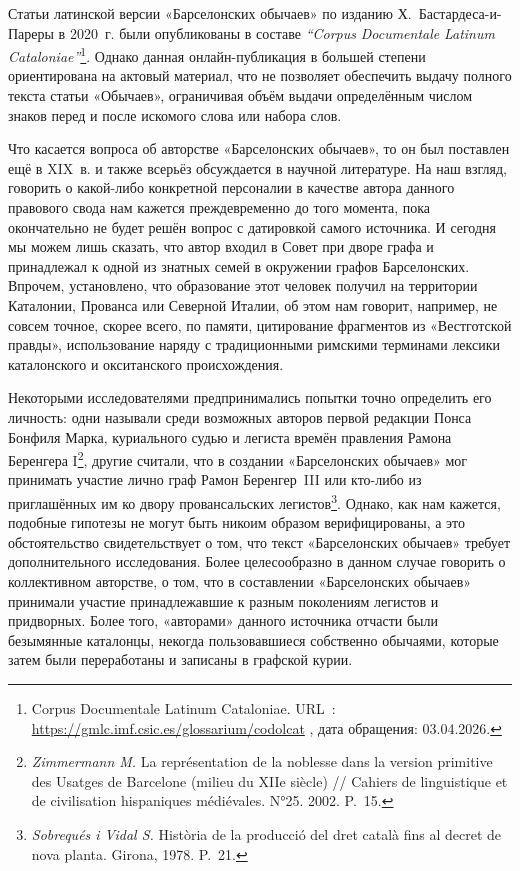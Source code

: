Статьи латинской версии «Барселонских обычаев» по изданию Х.~Бастардеса-и-Пареры в 2020~г. были опубликованы в составе \emph{“Corpus }\emph{Documentale}\emph{ }\emph{Latinum}\emph{ }\emph{Cataloniae}\emph{”}\footnote{Corpus Documentale Latinum Cataloniae. URL~: \url{https://gmlc.imf.csic.es/glossarium/codolcat} , дата обращения: 03.04.2026.}. Однако данная онлайн-публикация в большей степени ориентирована на актовый материал, что не позволяет обеспечить выдачу полного текста статьи «Обычаев», ограничивая объём выдачи определённым числом знаков перед и после искомого слова или набора слов.

Что касается вопроса об авторстве «Барселонских обычаев», то он был поставлен ещё в XIX~в. и также всерьёз обсуждается в научной литературе. На наш взгляд, говорить о какой-либо конкретной персоналии в качестве автора данного правового свода нам кажется преждевременно до того момента, пока окончательно не будет решён вопрос с датировкой самого источника. И сегодня мы можем лишь сказать, что автор входил в Совет при дворе графа и принадлежал к одной из знатных семей в окружении графов Барселонских. Впрочем, установлено, что образование этот человек получил на территории Каталонии, Прованса или Северной Италии, об этом нам говорит, например, не совсем точное, скорее всего, по памяти, цитирование фрагментов из «Вестготской правды», использование наряду с традиционными римскими терминами лексики каталонского и окситанского происхождения.

Некоторыми исследователями предпринимались попытки точно определить его личность: одни называли среди возможных авторов первой редакции Понса Бонфиля Марка, куриального судью и легиста времён правления Рамона Беренгера I\footnote{\emph{Zimmermann M. }La représentation de la noblesse dans la version primitive des Usatges de Barcelone (milieu du XIIe siècle) // Cahiers de linguistique et de civilisation hispaniques médiévales. N°25. 2002. P.~15.}, другие считали, что в создании «Барселонских обычаев» мог принимать участие лично граф Рамон Беренгер~III или кто-либо из приглашённых им ко двору провансальских легистов\footnote{\emph{Sobrequés i Vidal S. }Història de la producció del dret català fins al decret de nova planta. Girona, 1978. P.~21.}. Однако, как нам кажется, подобные гипотезы не могут быть никоим образом верифицированы, а это обстоятельство свидетельствует о том, что текст «Барселонских обычаев» требует дополнительного исследования. Более целесообразно в данном случае говорить о коллективном авторстве, о том, что в составлении «Барселонских обычаев» принимали участие принадлежавшие к разным поколениям легистов и придворных. Более того, «авторами» данного источника отчасти были безымянные каталонцы, некогда пользовавшиеся собственно обычаями, которые затем были переработаны и записаны в графской курии.

